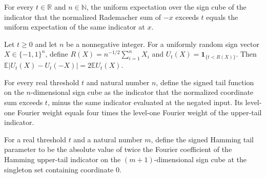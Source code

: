 \begin{theorem}
\label{FABL.expect_hammingUpperTailIndicator_comp_neg}
\leanok
{}
For every $t\in\mathbb R$ and $n\in\mathbb N$, the uniform expectation over the sign
cube of the indicator that the normalized Rademacher sum of $-x$ exceeds $t$ equals the
uniform expectation of the same indicator at $x$.
\end{theorem}

\begin{theorem}
\label{FABL.expect_abs_signedHammingTwoTail}
\leanok
{}
Let $t\geq0$ and let $n$ be a nonnegative integer. For a uniformly random sign vector
$X\in\{-1,1\}^n$, define $R(X)=n^{-1/2}\sum_{i=1}^n X_i$ and
$U_t(X)=\mathbf{1}_{\{t<R(X)\}}$. Then $\mathbb{E}|U_t(X)-U_t(-X)|=2\mathbb{E}U_t(X)$.
\end{theorem}

\begin{theorem}
\label{FABL.fourierWeightAtLevel_one_signedHammingTwoTail}
\leanok
{}
For every real threshold $t$ and natural number $n$, define the signed tail function on
the $n$-dimensional sign cube as the indicator that the normalized coordinate sum
exceeds $t$, minus the same indicator evaluated at the negated input. Its level-one
Fourier weight equals four times the level-one Fourier weight of the upper-tail
indicator.
\end{theorem}

\begin{definition}
\label{FABL.signedHammingTwoTailEpsilon}
\leanok
{}
For a real threshold $t$ and a natural number $m$, define the signed Hamming tail
parameter to be the absolute value of twice the Fourier coefficient of the Hamming
upper-tail indicator on the $(m+1)$-dimensional sign cube at the singleton set
containing coordinate $0$.
\end{definition}

